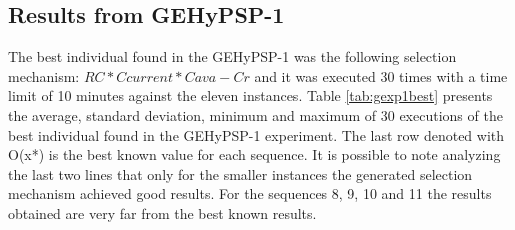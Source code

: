 \documentclass[conference]{IEEEtran}
\begin{document}





\subsection{Results from GEHyPSP-1}

The best individual found in the GEHyPSP-1 was the following selection mechanism:  $RC * Ccurrent * Cava - Cr$ and it was executed 30 times with a time limit of 10 minutes against the eleven instances. Table \ref{tab:gexp1best}  presents the average, standard deviation, minimum and maximum of 30 executions of the best individual found in the GEHyPSP-1 experiment. The last row denoted with O(x*) is the best known value for each sequence. It is possible to note analyzing the last two lines that only for the smaller instances the generated selection mechanism achieved good results. For the sequences 8, 9, 10 and 11 the results obtained are very far from the best known results.
\end{document}

